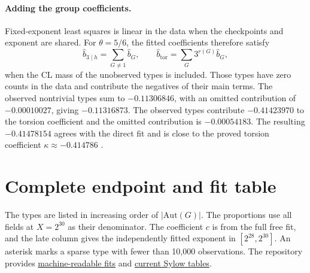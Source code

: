 \documentclass[11pt]{article}
\newcommand{\Aut}{\mathrm{Aut}}
\begin{document}
\paragraph{Adding the group coefficients.}
Fixed-exponent least squares is linear in the data when the checkpoints
and exponent are shared. For \(\theta=5/6\), the fitted coefficients
therefore satisfy
\[
\widehat b_{3\mid h}=\sum_{G\ne1}\widehat b_G,
\qquad
\widehat b_{\mathrm{tor}}=\sum_G 3^{r(G)}\widehat b_G,
\]
when the CL mass of the unobserved types is included. Those types have zero
counts in the data and contribute the negatives of their main terms.
The observed nontrivial types sum to \(-0.11306846\), with an omitted
contribution of \(-0.00010027\), giving \(-0.11316873\).
The observed types contribute \(-0.41423970\) to the torsion coefficient
and the omitted contribution is \(-0.00054183\). The resulting
\(-0.41478154\) agrees with the direct fit and is close to the proved
torsion coefficient \(\kappa\approx-0.414786\) \cite{tt}.

\section{Complete endpoint and fit table}

The types are listed in increasing order of \(|\Aut(G)|\).
The proportions use all fields at \(X=2^{30}\) as their denominator.
The coefficient \(c\) is from the full free fit, and the late column
gives the independently fitted exponent in \([2^{28},2^{30}]\).
An asterisk marks a sparse type with fewer than 10,000 observations. The repository provides
\href{https://github.com/IsaacLi74/cohen-lenstra-asymptotics/blob/34f8aef5c9e04200648e31a4192fa16ef3421470/results/fit_summary.csv}{machine-readable fits}
and \href{https://github.com/IsaacLi74/cohen-lenstra-asymptotics/blob/main/results/calculations.md}{current Sylow tables}.
\end{document}
